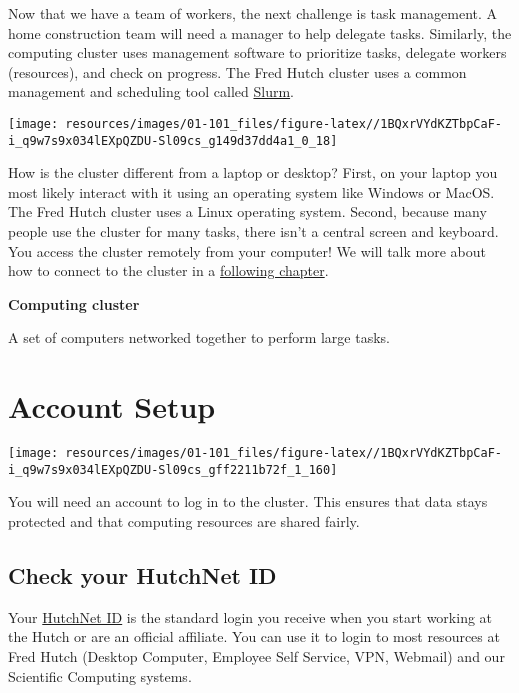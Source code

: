 \documentclass[
]{book}
\begin{document}
Now that we have a team of workers, the next challenge is task management. A home construction team will need a manager to help delegate tasks. Similarly, the computing cluster uses management software to prioritize tasks, delegate workers (resources), and check on progress. The Fred Hutch cluster uses a common management and scheduling tool called \href{https://slurm.schedmd.com/overview.html}{Slurm}.

\texttt{[image: resources/images/01-101\_files/figure-latex//1BQxrVYdKZTbpCaF-i\_q9w7s9x034lEXpQZDU-Sl09cs\_g149d37dd4a1\_0\_18]}

How is the cluster different from a laptop or desktop? First, on your laptop you most likely interact with it using an operating system like Windows or MacOS. The Fred Hutch cluster uses a Linux operating system. Second, because many people use the cluster for many tasks, there isn't a central screen and keyboard. You access the cluster remotely from your computer! We will talk more about how to connect to the cluster in a \protect\hyperlink{terminal}{following chapter}.

\textbf{Computing cluster}

A set of computers networked together to perform large tasks.

\hypertarget{account-setup}{%
\chapter{Account Setup}\label{account-setup}}

\texttt{[image: resources/images/01-101\_files/figure-latex//1BQxrVYdKZTbpCaF-i\_q9w7s9x034lEXpQZDU-Sl09cs\_gff2211b72f\_1\_160]}

You will need an account to log in to the cluster. This ensures that data stays protected and that computing resources are shared fairly.

\hypertarget{check-your-hutchnet-id}{%
\section{Check your HutchNet ID}\label{check-your-hutchnet-id}}

Your \href{https://centernet.fredhutch.org/cn/u/center-it/help-desk.html}{HutchNet ID} is the standard login you receive when you start working at the Hutch or are an official affiliate. You can use it to login to most resources at Fred Hutch (Desktop Computer, Employee Self Service, VPN, Webmail) and our Scientific Computing systems.
\end{document}
